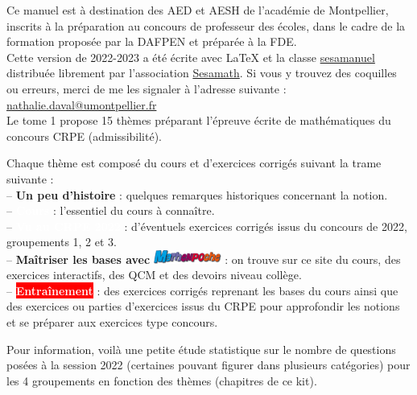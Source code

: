 \pagebreak

Ce manuel est à destination des {\small AED} et {\small AESH} de l'académie de Montpellier, inscrits à la préparation au concours de professeur des écoles, dans le cadre de la formation proposée par la {\small DAFPEN} et préparée à la {\small FDE}. \\

Cette version de 2022-2023 a été écrite avec \LaTeX{} et la classe \href{https://www.ctan.org/pkg/sesamanuel}{\blue sesamanuel} distribuée librement par l'association \href{http://www.sesamath.net}{\blue Sesamath}. Si vous y trouvez des coquilles ou erreurs, merci de me les signaler à l'adresse suivante : \\
\href{mailto:nathalie.daval@umontpellier.fr}{nathalie.daval@umontpellier.fr} \\

Le tome 1 propose 15 thèmes préparant l'épreuve écrite de mathématiques du concours {\small CRPE} (admissibilité).

Chaque thème est composé du cours et d'exercices corrigés suivant la trame suivante : \\ [2mm]
   -- {\textcolor{B2}{\sffamily\bfseries Un peu d'histoire}} : quelques remarques historiques concernant la notion. \\ [2mm]
   -- \colorbox{A2}{\textcolor{white}{\sffamily\bfseries Cours}} : l'essentiel du cours à connaître. \\ [2mm]
   -- \colorbox{G1}{\textcolor{white}{\sffamily\bfseries Vu au CRPE 2022}} : d'éventuels exercices corrigés issus du concours de 2022, groupements 1, 2 et 3. \\ [2mm]
   -- {\cursive\bfseries Maîtriser les bases avec \includegraphics[width=2.2cm]{Nombres_et_calculs/Images/mathenpoche}} : on trouve sur ce site du cours, des exercices interactifs, des {\small QCM} et des devoirs niveau collège. \\ [2mm]
   -- \colorbox{red}{\textcolor{white}{\sffamily\bfseries Entraînement}} : des exercices corrigés reprenant les bases du cours ainsi que des exercices ou parties d'exercices issus du {\small CRPE} pour approfondir les notions et se préparer aux exercices type concours. \\  [2mm]

   \vfill
   
   Pour information, voilà une petite étude statistique sur le nombre de questions posées à la session 2022 (certaines pouvant figurer dans plusieurs catégories) pour les 4 groupements en fonction des thèmes (chapitres de ce kit).
   
